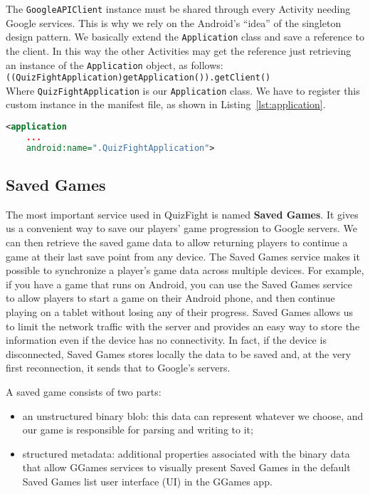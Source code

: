 The \texttt{GoogleAPIClient} instance must be shared through every Activity
needing Google services.
This is why we rely on the Android's ``idea'' of the singleton design pattern.
We basically extend the \texttt{Application} class and save a reference to the
client. In this way the other Activities may get the reference just retrieving
an instance of the \texttt{Application} object, as follows: \\

\texttt{((QuizFightApplication)getApplication()).getClient()} \\

Where \texttt{QuizFightApplication} is our \texttt{Application} class.
We have to register this custom instance in the manifest file, as shown in
Listing~\ref{lst:application}.

\begin{lstlisting}[language=xml, caption={Application declaration}, label={lst:application}]
<application
	...
	android:name=".QuizFightApplication">
\end{lstlisting}

\subsection{Saved Games}

The most important service used in QuizFight is named \textbf{Saved Games}.
It gives us a convenient way to save our players' game progression to Google
servers. We can then retrieve the saved game data to allow returning players
to continue a game at their last save point from any device.
The Saved Games service makes it possible to synchronize a player's game data
across multiple devices.
For example, if you have a game that runs on Android, you can use the Saved
Games service to allow players to start a game on their Android phone, and
then continue playing on a tablet without losing any of their progress.
Saved Games allows us to limit the network traffic with the server and
provides an easy way to store the information even if the device has no
connectivity.
In fact, if the device is disconnected, Saved Games stores locally the data
to be saved and, at the very first reconnection, it sends that to Google's
servers.

A saved game consists of two parts:

\begin{itemize}
	\item an unstructured binary blob: this data can represent whatever we
choose, and our game is responsible for parsing and writing to it;
	\item structured metadata: additional properties associated with the
binary data that allow GGames services to visually present Saved Games in
the default Saved Games list user interface (UI) in the GGames app.
\end{itemize}

